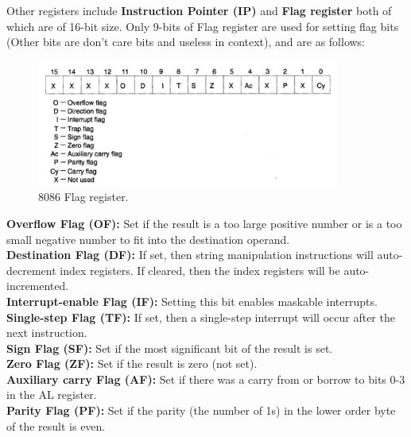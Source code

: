 \documentclass[12pt, a4paper]{scrartcl}
\begin{document}
	Other registers include \textbf{Instruction Pointer (IP)} and \textbf{Flag register} both of which are of 16-bit size. Only 9-bits of Flag register are used for setting flag bits (Other bits are don't care bits and useless in context), and are as follows: \\

	\begin{figure}[h]
		\centering
		\includegraphics[width=0.89\textwidth]{images/8086-flag-registers.png}
		\caption{8086 Flag register.}
		\label{image-4}
	\end{figure}

	\textbf{Overflow Flag (OF): }Set if the result is a too large positive number or is a too small negative number to fit into the destination operand. \\

	\textbf{Destination Flag (DF): }If set, then string manipulation instructions will auto-decrement index registers. If cleared, then the index registers will be auto-incremented. \\

	\textbf{Interrupt-enable Flag (IF): }Setting this bit enables maskable interrupts. \\

	\textbf{Single-step Flag (TF): }If set, then a single-step interrupt will occur after the next instruction. \\

	\textbf{Sign Flag (SF): }Set if the most significant bit of the result is set. \\

	\textbf{Zero Flag (ZF): }Set if the result is zero (not set). \\

	\textbf{Auxiliary carry Flag (AF): }Set if there was a carry from or borrow to bits 0-3 in the AL register. \\

	\textbf{Parity Flag (PF): }Set if the parity (the number of 1s) in the lower order byte of the result is even. \\
\end{document}
